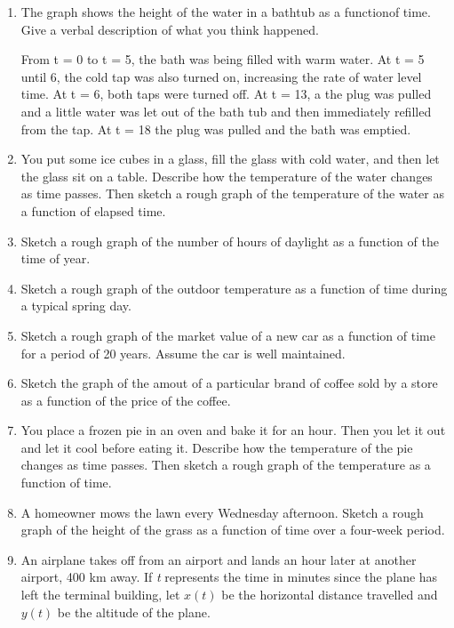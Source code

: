 \documentclass{article}
\begin{document}
\begin{enumerate}
		\item The graph shows the height of the water in a bathtub as a functionof time. Give a verbal
			description of what you think happened.
			
			 From t = 0 to t = 5, the bath was being filled with warm water. At t = 5 until 6, the cold
			 tap was also turned on, increasing the rate of water level time. At t = 6, both taps were
			 turned off. At t = 13, a the plug was pulled and a little water was let out of the bath tub
			 and then immediately refilled from the tap. At t = 18 the plug was pulled and the bath 
			 was emptied.
			 
		\item You put some ice cubes in a glass, fill the glass with cold water, and then let the glass sit on 
			a table. Describe how the temperature of the water changes as time passes. Then sketch a
			rough graph of the temperature of the water as a function of elapsed time.
			
		\item Sketch a rough graph of the number of hours of daylight as a function of the time of year.
		
		\item Sketch a rough graph of the outdoor temperature as a function of time during a typical
			spring day.
			
		\item Sketch a rough graph of the market value of a new car as a function of time for a period of 
			20 years. Assume the car is well maintained.
			
		\item Sketch the graph of the amout of a particular brand of coffee sold by a store as a function
			of the price of the coffee.
			
		\item You place a frozen pie in an oven and bake it for an hour. Then you let it out and let it cool before
			eating it. Describe how the temperature of the pie changes as time passes. Then sketch a rough
			graph of the temperature as a function of time.
			
		\item  A homeowner mows the lawn every Wednesday afternoon. Sketch a rough graph of the height of
			the grass as a function of time over a four-week period.
			
		\item An airplane takes off from an airport and lands an hour later at another airport, 400 km away.
			If \emph{t} represents the time in minutes since the plane has left the terminal building, let
			$x(t)$ be the horizontal distance travelled and $y(t)$ be the altitude of the plane.
			

\end{enumerate}
\end{document}
